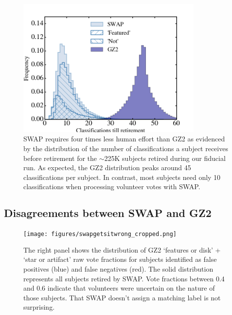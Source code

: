 \documentclass[twocolumn]{aastex6}
\begin{document}
\begin{figure}[t!]
\includegraphics[width=3.65in]{figures/GZX_clicks_till_retired_baseline.png}
\caption{SWAP requires four times less human effort than GZ2 as evidenced by the distribution of the number of classifications a subject receives before retirement for the $\sim$225K subjects retired during our fiducial run.  As expected, the GZ2 distribution peaks around 45 classifications per subject. In contrast, most subjects need only 10 classifications when processing volunteer votes with SWAP.  \label{fig: swap vote distributions}}
\end{figure}



\subsection{Disagreements between SWAP and GZ2}

\begin{figure}[t!]
\texttt{[image: figures/swapgetsitwrong\_cropped.png]}
\caption{The right panel shows the distribution of GZ2 `features or disk' + `star or artifact'  raw vote fractions for subjects identified as false positives (blue) and false negatives (red). The solid distribution represents all subjects retired by SWAP. Vote fractions between 0.4 and 0.6 indicate that volunteers were uncertain on the nature of those subjects.  That SWAP doesn't assign a matching label is not surprising.  \label{fig: SWAP sucks}}
\end{figure}
\end{document}
